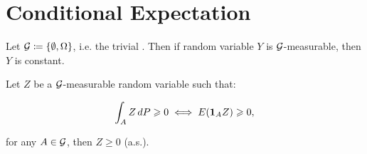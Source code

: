
\section{Conditional Expectation}

\begin{exercise}{8.1}{}

    Let $\mathcal{G} \coloneqq \{\emptyset, \Omega\}$, i.e. the trivial \SigmaAlgebra. Then if random variable $Y$ is $\mathcal{G}$-measurable, then $Y$ is constant.

\end{exercise}

\begin{lemma}{8.2}{}

    Let $Z$ be a $\mathcal{G}$-measurable random variable such that:

        \begin{align*}
            \int_{A} Z \, dP \geqslant 0 \iff E(\mathbf{1}_{A}Z) \geqslant 0,
        \end{align*}

    for any $A \in \mathcal{G}$, then $Z \geq 0$ (a.s.).

\end{lemma}
